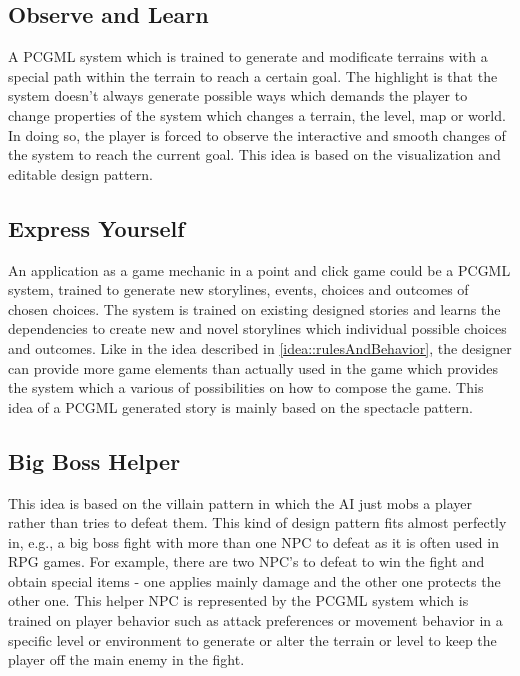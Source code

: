 \documentclass[MGS,Master,english]{twbook}%
\begin{document}
\subsection{Observe and Learn} \label{idea::observeAndLearn}
A PCGML system which is trained to generate and modificate terrains with a special path within the terrain to reach a certain goal. The highlight is that the system doesn't always generate possible ways which demands the player to change properties of the system which changes a terrain, the level, map or world. In doing so, the player is forced to observe the interactive and smooth changes of the system to reach the current goal. This idea is based on the visualization and editable design pattern.

\subsection{Express Yourself} \label{idea::expressYourself}
An application as a game mechanic in a point and click game could be a PCGML system, trained to generate new storylines, events, choices and outcomes of chosen choices. The system is trained on existing designed stories and learns the dependencies to create new and novel storylines which individual possible choices and outcomes. Like in the idea described in  \ref{idea::rulesAndBehavior}, the designer can provide more game elements than actually used in the game which provides the system which a various of possibilities on how to compose the game. This idea of a PCGML generated story is mainly based on the spectacle pattern.

\subsection{Big Boss Helper} \label{idea::bigBossHelper}
This idea is based on the villain pattern in which the AI just mobs a player rather than tries to defeat them. This kind of design pattern fits almost perfectly in, e.g., a big boss fight with more than one NPC to defeat as it is often used in RPG games. For example, there are two NPC's to defeat to win the fight and obtain special items - one applies mainly damage and the other one protects the other one. This helper NPC is represented by the PCGML system which is trained on player behavior such as attack preferences or movement behavior in a specific level or environment to generate or alter the terrain or level to keep the player off the main enemy in the fight.
\end{document}

